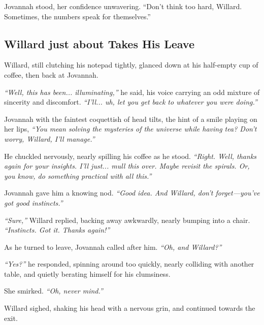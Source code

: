 Jovannah stood, her confidence unwavering. “Don’t think too hard, Willard. Sometimes, the numbers speak for themselves.”




\subsection*{Willard just about Takes His Leave}

Willard, still clutching his notepad tightly, glanced down at his half-empty cup of coffee, then back at Jovannah. 

\textit{“Well, this has been... illuminating,”} he said, his voice carrying an odd mixture of sincerity and discomfort. \textit{“I’ll... uh, let you get back to whatever you were doing.”}
\bigskip

Jovannah with the faintest coquettish of head tilts, the hint of a smile playing on her lips, \textit{“You mean solving the mysteries of the universe while having tea? Don’t worry, Willard, I’ll manage.”}
\bigskip

He chuckled nervously, nearly spilling his coffee as he stood. \textit{“Right. Well, thanks again for your insights. I’ll just... mull this over. Maybe revisit the spirals. Or, you know, do something practical with all this.”}
\bigskip

Jovannah gave him a knowing nod. \textit{“Good idea. And Willard, don’t forget—you’ve got good instincts.”}
\bigskip

\textit{“Sure,”} Willard replied, backing away awkwardly, nearly bumping into a chair. \textit{“Instincts. Got it. Thanks again!”}
\bigskip

As he turned to leave, Jovannah called after him. \textit{“Oh, and Willard?”}
\bigskip

\textit{“Yes?”} he responded, spinning around too quickly, nearly colliding with another table, and quietly berating himself for his clumsiness.

She smirked. \textit{“Oh, never mind.”} 

Willard sighed, shaking his head with a nervous grin, and continued towards the exit. 

